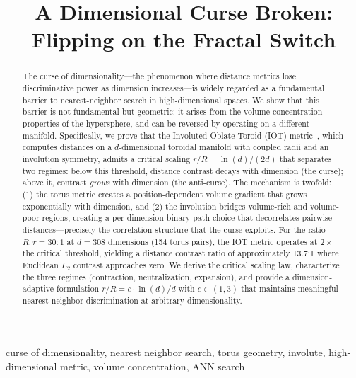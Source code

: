 \documentclass[conference]{IEEEtran}
\theoremstyle{definition}
\begin{document}
\title{A Dimensional Curse Broken:\\Flipping on the Fractal Switch}

\author{
}

\maketitle

\begin{abstract}
The curse of dimensionality---the phenomenon where distance metrics lose discriminative power as dimension increases---is widely regarded as a fundamental barrier to nearest-neighbor search in high-dimensional spaces. We show that this barrier is not fundamental but geometric: it arises from the volume concentration properties of the hypersphere, and can be reversed by operating on a different manifold. Specifically, we prove that the Involuted Oblate Toroid (IOT) metric~\cite{gaddr2025ppf}, which computes distances on a $d$-dimensional toroidal manifold with coupled radii and an involution symmetry, admits a critical scaling $r/R = \ln(d)/(2d)$ that separates two regimes: below this threshold, distance contrast decays with dimension (the curse); above it, contrast \emph{grows} with dimension (the anti-curse). The mechanism is twofold: (1) the torus metric creates a position-dependent volume gradient that grows exponentially with dimension, and (2) the involution bridges volume-rich and volume-poor regions, creating a per-dimension binary path choice that decorrelates pairwise distances---precisely the correlation structure that the curse exploits. For the ratio $R{:}r = 30{:}1$ at $d = 308$ dimensions (154 torus pairs), the IOT metric operates at $2\times$ the critical threshold, yielding a distance contrast ratio of approximately 13.7:1 where Euclidean $L_2$ contrast approaches zero. We derive the critical scaling law, characterize the three regimes (contraction, neutralization, expansion), and provide a dimension-adaptive formulation $r/R = c \cdot \ln(d)/d$ with $c \in (1,3)$ that maintains meaningful nearest-neighbor discrimination at arbitrary dimensionality.
\end{abstract}

\begin{IEEEkeywords}
curse of dimensionality, nearest neighbor search, torus geometry, involute, high-dimensional metric, volume concentration, ANN search
\end{IEEEkeywords}













\end{document}

